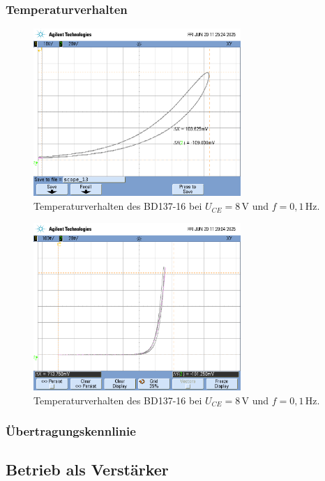 \documentclass[
	a4paper, %
	12pt, %
]{CSUniSchoolLabReport}
\begin{document}
\subsubsection{Temperaturverhalten}
\begin{figure}[H]
	\centering
	\includegraphics[width=0.7\textwidth]{Figures/TemperaturHysterese8V0.1hznah.png}
	\caption{Temperaturverhalten des BD137-16 bei $U_{CE} = 8\,\mathrm{V}$ und $f = 0{,}1\,\mathrm{Hz}$.}
	\label{fig:8VTemperaturHysterese0.1hznah}
\end{figure}\begin{figure}[H]
	\centering
	\includegraphics[width=0.7\textwidth]{Figures/8V1khz0.1hzzusammentemp.png}
	\caption{Temperaturverhalten des BD137-16 bei $U_{CE} = 8\,\mathrm{V}$ und $f = 0{,}1\,\mathrm{Hz}$.}
	\label{fig:8V1khz0.1hzzusammentemp}
\end{figure}

\subsubsection{Übertragungskennlinie}
\subsection{Betrieb als Verstärker}
\end{document}
